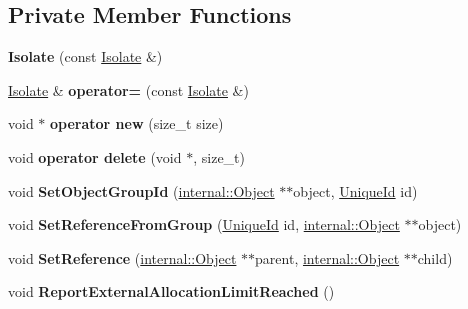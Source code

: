 \subsection*{Private Member Functions}
\begin{DoxyCompactItemize}
\item 
{\bfseries Isolate} (const \hyperlink{classv8_1_1_isolate}{Isolate} \&)\hypertarget{classv8_1_1_isolate_a979321fdbb883356189324cb273157b5}{}\label{classv8_1_1_isolate_a979321fdbb883356189324cb273157b5}

\item 
\hyperlink{classv8_1_1_isolate}{Isolate} \& {\bfseries operator=} (const \hyperlink{classv8_1_1_isolate}{Isolate} \&)\hypertarget{classv8_1_1_isolate_a6956413fd22aed96a31b8a5ffe075e62}{}\label{classv8_1_1_isolate_a6956413fd22aed96a31b8a5ffe075e62}

\item 
void $\ast$ {\bfseries operator new} (size\+\_\+t size)\hypertarget{classv8_1_1_isolate_a2e4a83509115f47018e9b24adb3496a6}{}\label{classv8_1_1_isolate_a2e4a83509115f47018e9b24adb3496a6}

\item 
void {\bfseries operator delete} (void $\ast$, size\+\_\+t)\hypertarget{classv8_1_1_isolate_a952adce6105528dff9fd48db6953a31a}{}\label{classv8_1_1_isolate_a952adce6105528dff9fd48db6953a31a}

\item 
void {\bfseries Set\+Object\+Group\+Id} (\hyperlink{classv8_1_1internal_1_1_object}{internal\+::\+Object} $\ast$$\ast$object, \hyperlink{classv8_1_1_unique_id}{Unique\+Id} id)\hypertarget{classv8_1_1_isolate_a19de4baa103e8b7b4266fba9563e0634}{}\label{classv8_1_1_isolate_a19de4baa103e8b7b4266fba9563e0634}

\item 
void {\bfseries Set\+Reference\+From\+Group} (\hyperlink{classv8_1_1_unique_id}{Unique\+Id} id, \hyperlink{classv8_1_1internal_1_1_object}{internal\+::\+Object} $\ast$$\ast$object)\hypertarget{classv8_1_1_isolate_ab3d68205008e21a4bdc5640cb313e6bd}{}\label{classv8_1_1_isolate_ab3d68205008e21a4bdc5640cb313e6bd}

\item 
void {\bfseries Set\+Reference} (\hyperlink{classv8_1_1internal_1_1_object}{internal\+::\+Object} $\ast$$\ast$parent, \hyperlink{classv8_1_1internal_1_1_object}{internal\+::\+Object} $\ast$$\ast$child)\hypertarget{classv8_1_1_isolate_ac3d2330d18a3aec1de8de6165364e685}{}\label{classv8_1_1_isolate_ac3d2330d18a3aec1de8de6165364e685}

\item 
void {\bfseries Report\+External\+Allocation\+Limit\+Reached} ()\hypertarget{classv8_1_1_isolate_a46368f020b87e91876ec06bfdb255911}{}\label{classv8_1_1_isolate_a46368f020b87e91876ec06bfdb255911}

\end{DoxyCompactItemize}
